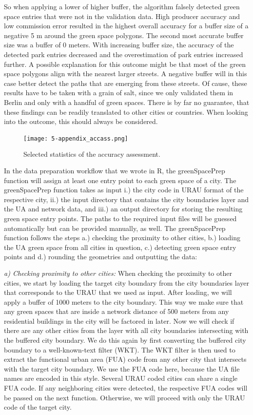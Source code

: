\documentclass[10pt]{article}
\begin{document}
So when applying a lower of higher buffer, the algorithm falsely detected green space entries that were not in the validation data.
High producer accuracy and low commission error resulted in the highest overall accuracy for a buffer size of a negative 5 m around the green space polygons.
The second most accurate buffer size was a buffer of 0 meters. 
With increasing buffer size, the accuracy of the detected park entries decreased and the overestimation of park entries increased further.
A possible explanation for this outcome might be that most of the green space polygons align with the nearest larger streets.
A negative buffer will in this case better detect the paths that are emerging from these streets.
Of cause, these results have to be taken with a grain of salt, since we only validated them in Berlin and only with a handful of green spaces.
There is by far no guarantee, that these findings can be readily translated to other cities or countries.
When looking into the outcome, this should always be considered.

\begin{figure}
\texttt{[image: 5-appendix\_accass.png]}
\caption{Selected statistics of the accuracy assessment.}
\end{figure}

In the data preparation workflow that we wrote in R, the greenSpacePrep function will assign at least one entry point to each green space of a city.
The greenSpacePrep function takes as input i.) the city code in URAU format of the respective city, ii.) the input directory that contains the city boundaries layer and the UA and network data, and iii.) an output directory for storing the resulting green space entry points.
The paths to the required input files will be guessed automatically but can be provided manually, as well.
The greenSpacePrep function follows the steps a.) checking the proximity to other cities, b.) loading the UA green space from all cities in question, c.) detecting green space entry points and d.) rounding the geometries and outputting the data:

\textit{a) Checking proximity to other cities:} When checking the proximity to other cities, we start by loading the target city boundary from the city boundaries layer that corresponds to the URAU that we used as input. After loading, we will apply a buffer of 1000 meters to the city boundary. This way we make sure that any green spaces that are inside a network distance of 500 meters from any residential buildings in the city will be factored in later. Now we will check if there are any other cities from the layer with all city boundaries intersecting with the buffered city boundary. We do this again by first converting the buffered city boundary to a well-known-text filter (WKT). The WKT filter is then used to extract the functional urban area (FUA) code from any other city that intersects with the target city boundary. We use the FUA code here, because the UA file names are encoded in this style. Several URAU coded cities can share a single FUA code. If any neighboring cities were detected, the respective FUA codes will be passed on the next function. Otherwise, we will proceed with only the URAU code of the target city.
\end{document}
